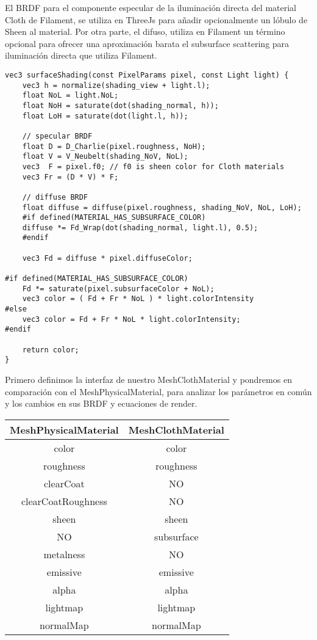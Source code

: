     El BRDF para el componente especular de la iluminaci\'on directa del material Cloth de Filament,
    se utiliza en ThreeJs para a\~nadir opcionalmente un l\'obulo de Sheen al material. Por otra
    parte, el difuso, utiliza en Filament un t\'ermino opcional para ofrecer una aproximaci\'on
    barata el subsurface scattering para iluminaci\'on directa que utiliza Filament.\newline
    
    \begin{lstlisting}[caption=Implementaci\'on del BRDF de iluminaci\'on directa de Filament]
vec3 surfaceShading(const PixelParams pixel, const Light light) {
    vec3 h = normalize(shading_view + light.l);
    float NoL = light.NoL;
    float NoH = saturate(dot(shading_normal, h));
    float LoH = saturate(dot(light.l, h));

    // specular BRDF
    float D = D_Charlie(pixel.roughness, NoH);
    float V = V_Neubelt(shading_NoV, NoL);
    vec3  F = pixel.f0; // f0 is sheen color for Cloth materials 
    vec3 Fr = (D * V) * F;

    // diffuse BRDF
    float diffuse = diffuse(pixel.roughness, shading_NoV, NoL, LoH);
    #if defined(MATERIAL_HAS_SUBSURFACE_COLOR)
    diffuse *= Fd_Wrap(dot(shading_normal, light.l), 0.5);
    #endif

    vec3 Fd = diffuse * pixel.diffuseColor;

#if defined(MATERIAL_HAS_SUBSURFACE_COLOR)
    Fd *= saturate(pixel.subsurfaceColor + NoL);
    vec3 color = ( Fd + Fr * NoL ) * light.colorIntensity
#else
    vec3 color = Fd + Fr * NoL * light.colorIntensity;
#endif

    return color;
}
    \end{lstlisting}
    
    Primero definimos la interfaz de nuestro MeshClothMaterial y pondremos en comparaci\'on con
    el MeshPhysicalMaterial, para analizar los par\'ametros en com\'un y los cambios en sus BRDF
    y ecuaciones de render.\newline
    
    \centering
    \begin{tabular}{| c | c |}
    \hline
    MeshPhysicalMaterial & MeshClothMaterial \\ \hline
    color & color \\
    roughness & roughness \\
    clearCoat & NO \\
    clearCoatRoughness & NO \\
    sheen  & sheen  \\
    NO  & subsurface  \\
    metalness & NO \\
    emissive & emissive \\
    alpha & alpha \\
    lightmap & lightmap \\
    normalMap & normalMap \\ \hline
    \end{tabular}\\
    \egroup